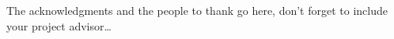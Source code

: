 \documentclass[
11pt, %
english, %
singlespacing, %
headsepline, %
]{MastersDoctoralThesis} %
\theoremstyle{plain}
\theoremstyle{definition}
\theoremstyle{remark}
\begin{document}




\mainmatter %

\pagestyle{thesis} %



% 
%
% 
% 


\appendix %



%
%


\printbibliography[heading=bibintoc]




\begin{acknowledgements}
	\addchaptertocentry{\acknowledgementname} %
	The acknowledgments and the people to thank go here, don't forget to include your project advisor\ldots
\end{acknowledgements}
\end{document}
